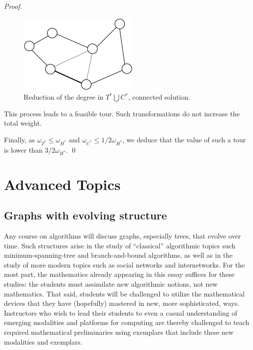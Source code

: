 \begin{proof}
\begin{figure}[hbt]
\begin{center}
       \includegraphics[scale=0.6]{FiguresGraph/christofides5}
       \caption{Reduction of the degree in $T^* \bigcup C^*$, connected solution.}
       \label{fig:christofidesFinalStep2}
\end{center}
\end{figure}

This process leads to a feasible tour. 
Such transformations do not increase the total weight.

Finally, 
as $\omega_{T^*} \leq \omega_{H^*}$ and $\omega_{C^*} \leq 1/2 \omega_{H^*}$,
we deduce that the value of such a tour is lower than $3/2 \omega_{H^*}$.
\qed
\end{proof}



\section{Advanced Topics}

\subsection{Graphs with evolving structure}

Any course on algorithms will discuss graphs, especially trees, that
evolve over time.  Such structures arise in the study of ``classical''
algorithmic topics such minimum-spanning-tree and branch-and-bound
algorithms, as well as in the study of more modern topics such as
social networks and internetworks.  For the most part, the mathematics
already appearing in this essay suffices for these studies: the students
must assimilate new algorithmic notions, not new mathematics.  That
said, students will be challenged to utilize the mathematical devices
that they have (hopefully) mastered in new, more sophisticated, ways.
Instructors who wish to lead their students to even a casual
understanding of emerging modalities and platforms for computing are
thereby challenged to teach required mathematical preliminaries using
exemplars that include these new modalities and exemplars.


